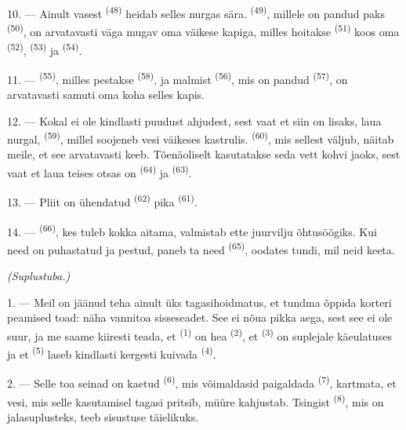 10. --- Ainult vasest  \textsuperscript{(48)} heidab selles nurgas
sära.  \textsuperscript{(49)}, millele on pandud paks 
\textsuperscript{(50)}, on arvatavasti väga mugav oma väikese kapiga, milles hoitakse
 \textsuperscript{(51)} koos oma 
\textsuperscript{(52)},  \textsuperscript{(53)} ja  \textsuperscript{(54)}.

\VUsaut{4.0mm}
\VUsaut{3.0mm}

11. ---  \textsuperscript{(55)}, milles pestakse 
\textsuperscript{(58)}, ja malmist  \textsuperscript{(56)}, mis on pandud
 \textsuperscript{(57)}, on arvatavasti samuti oma koha selles
kapis.

12. --- Kokal ei ole kindlasti puudust ahjudest, sest vaat et siin on lisaks, laua
nurgal,  \textsuperscript{(59)}, millel soojeneb vesi väikeses
kastrulis.  \textsuperscript{(60)}, mis sellest väljub, näitab meile, et see
arvatavasti keeb. Tõenäoliselt kasutatakse seda vett kohvi jaoks, sest vaat et laua
teises otsas on  \textsuperscript{(64)} ja 
\textsuperscript{(63)}.

13. --- Pliit on ühendatud  \textsuperscript{(62)} pika
 \textsuperscript{(61)}.

14. ---  \textsuperscript{(66)}, kes tuleb kokka aitama, valmistab
ette juurvilju õhtusöögiks. Kui need on puhastatud ja pestud, paneb ta need
 \textsuperscript{(65)}, oodates tundi, mil neid keeta.

\VUsaut{4.0mm}
{\centering\fontsize{10.2pt}{10.2pt}\selectfont{} \textit{(Suplustuba.)}\par}
\VUsaut{3.0mm}

1. --- Meil on jäänud teha ainult üks tagasihoidmatus, et tundma õppida korteri
peamised toad: näha vannitoa sisseseadet. See ei nõua pikka aega, sest see ei ole
suur, ja me saame kiiresti teada, et  \textsuperscript{(1)} on hea
 \textsuperscript{(2)}, et 
\textsuperscript{(3)} on suplejale käeulatuses ja et 
\textsuperscript{(5)} laseb kindlasti kergesti kuivada 
\textsuperscript{(4)}.

2. --- Selle toa seinad on kaetud  \textsuperscript{(6)}, mis
võimaldasid paigaldada  \textsuperscript{(7)}, kartmata, et vesi, mis selle
kasutamisel tagasi pritsib, müüre kahjustab. Tsingist 
\textsuperscript{(8)}, mis on jalasuplusteks, teeb sisustuse täielikuks.

\VUsaut{6.0mm}
\VUfilet{22mm}
